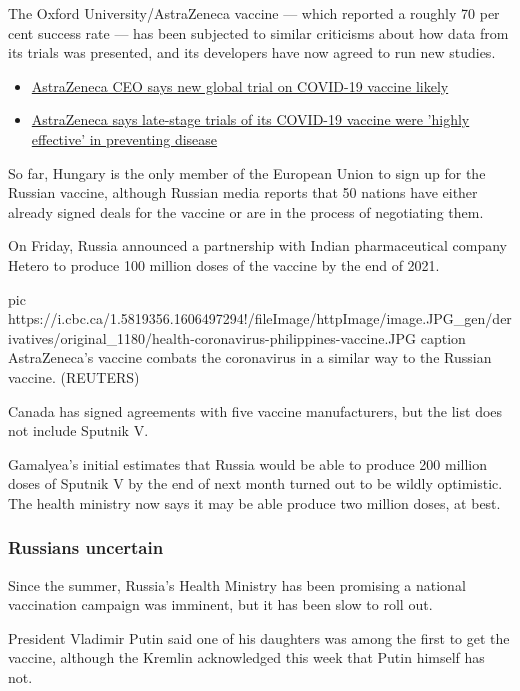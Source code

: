 The Oxford University/AstraZeneca vaccine — which reported a roughly 70 per
cent success rate — has been subjected to similar criticisms about how data
from its trials was presented, and its developers have now agreed to run new
studies.

\begin{itemize}
\item \href{https://www.cbc.ca/news/health/covid-19-vaccine-trial-astra-zeneca-1.5817410}{%
AstraZeneca CEO says new global trial on COVID-19 vaccine likely}
\item \href{https://www.cbc.ca/news/health/vaccine-covid-19-astrazeneca-1.5812268}{%
AstraZeneca says late-stage trials of its COVID-19 vaccine were 'highly effective' in preventing disease}
\end{itemize}

So far, Hungary is the only member of the European Union to sign up for the
Russian vaccine, although Russian media reports that 50 nations have either
already signed deals for the vaccine or are in the process of negotiating them.   

On Friday, Russia announced a partnership with Indian pharmaceutical company
Hetero to produce 100 million doses of the vaccine by the end of 2021.

\ifcmt
pic https://i.cbc.ca/1.5819356.1606497294!/fileImage/httpImage/image.JPG_gen/derivatives/original_1180/health-coronavirus-philippines-vaccine.JPG
caption AstraZeneca's vaccine combats the coronavirus in a similar way to the Russian vaccine. (REUTERS)
\fi

Canada has signed agreements with five vaccine manufacturers, but the list does
not include Sputnik V.

Gamalyea's initial estimates that Russia would be able to produce 200 million
doses of Sputnik V by the end of next month turned out to be wildly optimistic.
The health ministry now says it may be able produce two million doses, at best.

\subsubsection{Russians uncertain}

Since the summer,  Russia's Health Ministry has been promising a national
vaccination campaign was imminent, but it has been slow to roll out.   

President Vladimir Putin said one of his daughters was among the first to get
the vaccine, although the Kremlin acknowledged this week that Putin himself has
not. 


